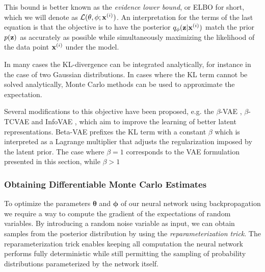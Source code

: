 This bound is better known as the \textit{evidence lower bound}, or ELBO for short, which we will denote as $\mathcal{L}(\mathbf{\theta}, \mathbf{\phi}; \mathbf{x}^{(i)})$. An interpretation for the terms of the last equation is that the objective is to have the posterior $q_{\mathbf{\phi}}(\mathbf{z} \vert \mathbf{x}^{(i)})$ match the prior $p(\mathbf{z})$ as accurately as possible while simultaneously maximizing the likelihood of the data point $\mathbf{x}^{(i)}$ under the model.

In many cases the KL-divergence can be integrated analytically, for instance in the case of two Gaussian distributions. In cases where the KL term cannot be solved analytically, Monte Carlo methods can be used to approximate the expectation.

Several modifications to this objective have been proposed, e.g. the $\beta$-VAE \cite{beta_vae, understanding_beta_vae}, $\beta$-TCVAE \cite{beta_tcvae} and InfoVAE \cite{infovae}, which aim to improve the learning of better latent representations. Beta-VAE prefixes the KL term with a constant $\beta$ which is interpreted as a Lagrange multiplier that adjusts the regularization imposed by the latent prior. The case where $\beta = 1$ corresponds to the VAE formulation presented in this section, while $\beta > 1$ 

\subsubsection{Obtaining Differentiable Monte Carlo Estimates}

To optimize the parameters $\mathbf{\theta}$ and $\mathbf{\phi}$ of our neural network using backpropagation we require a way to compute the gradient of the expectations of random variables. By introducing a random noise variable as input, we can obtain samples from the posterior distribution by using the \textit{reparameterization trick}. The reparameterization trick enables keeping all computation the neural network performs fully deterministic while still permitting the sampling of probability distributions parameterized by the network itself. 

